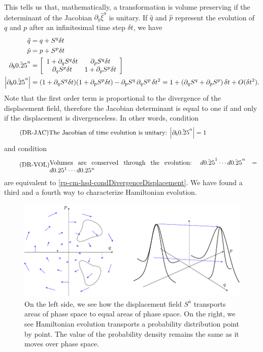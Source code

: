 This tells us that, mathematically, a transformation is volume preserving if the determinant of the Jacobian $\partial_b \hat{\xi}^a$ is unitary. If $\hat{q}$ and $\hat{p}$ represent the evolution of $q$ and $p$ after an infinitesimal time step $\delta t$, we have
\begin{equation}
	\begin{aligned}
	\hat{q} &= q + S^q \delta t \\ 
	\hat{p} &= p + S^p \delta t \\ 
	\partial_b \hat{\xi}^a &= \left[\begin{array}{ c c }
		1 + \partial_q S^q \delta t & \partial_p S^q \delta t \\
		\partial_q S^p \delta t & 1 + \partial_p S^p \delta t \\
	\end{array} \right] \\
	\left|\partial_b \hat{\xi}^a\right| &= (1 + \partial_q S^q \delta t) (1 + \partial_p S^p \delta t) - \partial_p S^q \, \partial_q S^p \, \delta t^2  = 1 + \left(\partial_q S^q + \partial_p S^p \right) \delta t + O(\delta t^2). 
	\end{aligned}
\end{equation}
Note that the first order term is proportional to the divergence of the displacement field, therefore the Jacobian determinant is equal to one if and only if the displacement is divergenceless. In other words, condition
\begin{equation}\label{rp-cm-hsd-condUnitaryJacobian}
	\tag{DR-JAC}
	\eqtext{The Jacobian of time evolution is unitary: $\left|\partial_b \hat{\xi}^a\right|=1$} 
\end{equation}
and condition
\begin{equation}\label{rp-cm-hsd-condConservedVolume}
	\tag{DR-VOL}
	\eqtext{Volumes are conserved through the evolution: $d\hat{\xi}^1 \cdots d\hat{\xi}^n = d\xi^1 \cdots d\xi^n$} 
\end{equation}
are equivalent to \ref{rp-cm-hsd-condDivergenceDisplacement}. We have found a third and a fourth way to characterize Hamiltonian evolution.

\begin{figure}[h]
	\centering
		\includegraphics{images/fig_rp_cm_AreaDensityConservation.pdf}
	\caption {On the left side, we see how the displacement field $S^a$ transports areas of phase space to equal areas of phase space. On the right, we see Hamiltonian evolution transports a probability distribution point by point. The value of the probability density remains the same as it moves over phase space.}\label{fig_rp_cm_AreaDensityConservation}
\end{figure}

